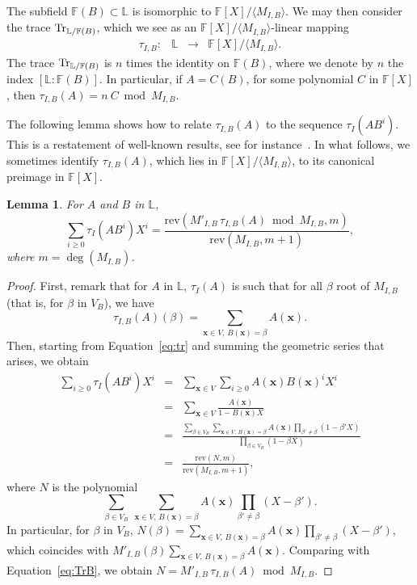 \documentclass[12pt]{article}
\def\F {\ensuremath{\mathbb{F}}}
\def\L {\ensuremath{\mathbb{L}}}
\def\rev {\ensuremath{\mathrm{rev}}}
\def\x {\ensuremath{\mathbf{x}}}
\newtheorem{Lemma}{Lemma}
\begin{document}
The subfield $\F(B) \subset \L$ is isomorphic to $\F[X]/\langle
M_{I,B} \rangle$. We may then consider the trace
${\rm Tr}_{\L/\F(B)}$, which we see as an $\F[X]/\langle
M_{I,B}\rangle$-linear mapping
$$
\begin{array}{cccc}
\tau_{I,B} :& \L& \to& \F[X]/\langle M_{I,B} \rangle.
\end{array}$$
The trace ${\rm Tr}_{\L/\F(B)}$ is $n$ times the identity on $\F(B)$,
where we denote by $n$ the index $[\L:\F(B)]$. In particular, if
$A=C(B)$, for some polynomial $C$ in $\F[X]$, then $\tau_{I,B}(A)=n
\ C \bmod M_{I,B}$.

The following lemma shows how to relate $\tau_{I,B} (A)$ to the
sequence $\tau_I(A B^i)$. This is a restatement of well-known results,
see for instance~\cite{rouiller99}. In what follows, we sometimes
identify $\tau_{I,B}(A)$, which lies in $\F[X]/\langle M_{I,B} \rangle$,
to its canonical preimage in $\F[X]$.

\begin{Lemma}\label{lemma:trace:1}
  For $A$ and $B$ in $\L$, 
  $$\sum_{i \ge 0} \tau_I(A B^i) X^i = \frac{\rev( M'_{I,B}\, \tau_{I,B}
    (A) \bmod M_{I,B},m)}{\rev(M_{I,B},m+1)},$$ where
  $m=\deg(M_{I,B})$.
\end{Lemma}
\begin{proof}
First, remark that for $A$ in $\L$, $\tau_{I}(A)$ is such that for all
$\beta$ root of $M_{I,B}$ (that is, for $\beta$ in $V_B$), we have
\begin{equation}\label{eq:TrB}
\tau_{I,B}(A)(\beta) = \sum_{\x \in V,\, B(\x)=\beta} A(\x).  
\end{equation}
Then, starting from Equation~\eqref{eq:tr} and summing the geometric
series that arises, we obtain
\begin{eqnarray*}
\sum_{i \ge 0} \tau_I(A B^i) X^i &=& \sum_{\x \in V} \sum_{i \ge 0} A(\x)B(\x)^i X^i\\
&=& \sum_{\x \in V} \frac{A(\x)}{1-B(\x)X}\\
&=& \frac{\sum_{\beta \in V_B} \sum_{\x \in V,\, B(\x)=\beta} A(\x) \prod_{\beta'\ne \beta} (1-\beta' X)}
    {\prod_{\beta \in V_B}(1-\beta X)}\\
&=& \frac{\rev(N,m)}{\rev(M_{I,B},m+1)},
\end{eqnarray*}
where $N$ is the polynomial
$$\sum_{\beta \in V_B}\ \sum_{\x \in V,\, B(\x)=\beta} A(\x) \prod_{\beta'\ne \beta} (X-\beta' ).$$
In particular, for  $\beta$ in $V_B$, $N(\beta)=\sum_{\x \in V,\, B(\x)=\beta} A(\x) \prod_{\beta'\ne \beta} (X-\beta' )$,
which coincides with $M'_{I,B}(\beta)\sum_{\x \in V,\, B(\x)=\beta} A(\x)$.
Comparing with Equation~\eqref{eq:TrB}, we obtain 
$N=M'_{I,B}\, \tau_{I,B}(A) \bmod M_{I,B}$.
\end{proof}
\end{document}
